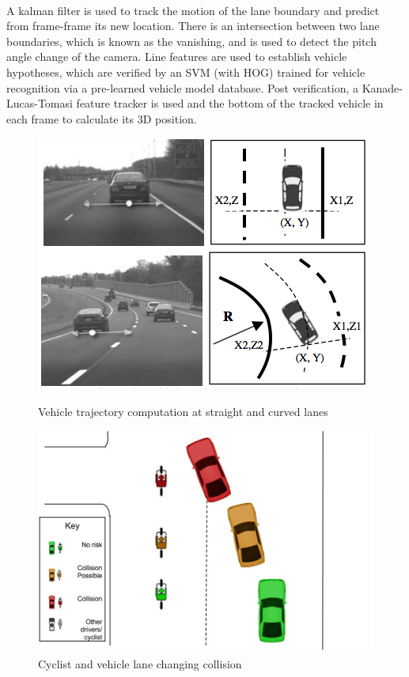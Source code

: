 \documentclass[]{report}
\begin{document}
\paragraph{}A kalman filter is used to track the motion of the lane boundary and predict from frame-frame its new location. There is an intersection between two lane boundaries, which is known as the vanishing, and is used to detect the pitch angle change of the camera. Line features are used to establish vehicle hypotheses, which are verified by an SVM (with HOG) trained for vehicle recognition via a pre-learned vehicle model database. Post verification, a Kanade-Lucas-Tomasi feature tracker is used and the bottom of the tracked vehicle in each frame to calculate its 3D position.


\begin{figure}
\centering
	\begin{minipage}{0.49\textwidth}
		\centering
		\includegraphics[scale=0.4]{figures/research_paper_figures/trajectory_multi-cue}
		\caption{Vehicle trajectory computation at straight and curved lanes \citep{multi-cue} }
	\end{minipage}\hfill
	\begin{minipage}{0.49\textwidth}
		\centering
		\includegraphics[scale=0.2]{figures/collision_avoidance_figures/Vehicle_changing_lane_into_the_path_of_a_cyclist}
		\caption{Cyclist and vehicle lane changing collision}
	\end{minipage}
\end{figure}
\end{document}
